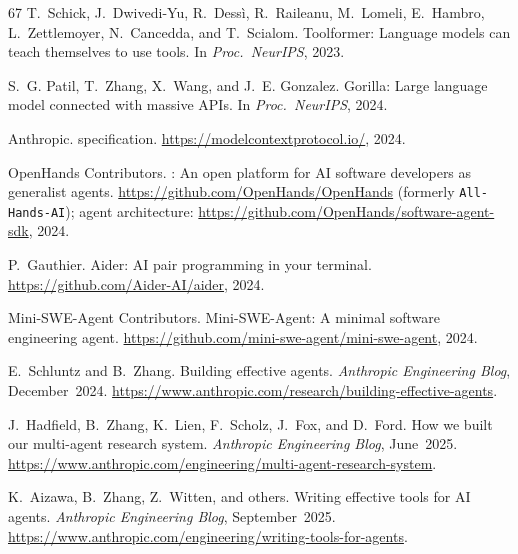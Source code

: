 \documentclass[11pt,a4paper]{article}
\begin{document}
\begin{thebibliography}{67}
T.~Schick, J.~Dwivedi-Yu, R.~Dess\`{i}, R.~Raileanu, M.~Lomeli, E.~Hambro, L.~Zettlemoyer, N.~Cancedda, and T.~Scialom.
\newblock Toolformer: Language models can teach themselves to use tools.
\newblock In \emph{Proc.\ NeurIPS}, 2023.

S.~G. Patil, T.~Zhang, X.~Wang, and J.~E. Gonzalez.
\newblock Gorilla: Large language model connected with massive {APIs}.
\newblock In \emph{Proc.\ NeurIPS}, 2024.

{Anthropic}.
 specification.
\newblock \url{https://modelcontextprotocol.io/}, 2024.

{OpenHands Contributors}.
: An open platform for {AI} software developers as generalist agents.
\newblock \url{https://github.com/OpenHands/OpenHands} (formerly \texttt{All-Hands-AI}); agent architecture: \url{https://github.com/OpenHands/software-agent-sdk}, 2024.

P.~Gauthier.
\newblock Aider: {AI} pair programming in your terminal.
\newblock \url{https://github.com/Aider-AI/aider}, 2024.

{Mini-SWE-Agent Contributors}.
\newblock Mini-{SWE}-{A}gent: A minimal software engineering agent.
\newblock \url{https://github.com/mini-swe-agent/mini-swe-agent}, 2024.

E.~Schluntz and B.~Zhang.
\newblock Building effective agents.
\newblock \emph{Anthropic Engineering Blog}, December~2024.
\newblock \url{https://www.anthropic.com/research/building-effective-agents}.

J.~Hadfield, B.~Zhang, K.~Lien, F.~Scholz, J.~Fox, and D.~Ford.
\newblock How we built our multi-agent research system.
\newblock \emph{Anthropic Engineering Blog}, June~2025.
\newblock \url{https://www.anthropic.com/engineering/multi-agent-research-system}.

K.~Aizawa, B.~Zhang, Z.~Witten, and others.
\newblock Writing effective tools for AI agents.
\newblock \emph{Anthropic Engineering Blog}, September~2025.
\newblock \url{https://www.anthropic.com/engineering/writing-tools-for-agents}.


\end{thebibliography}
\end{document}
